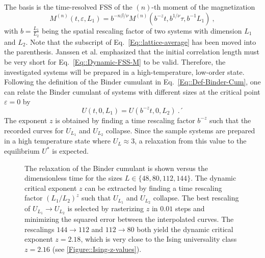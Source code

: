 	The basis is the time-resolved FSS of the $(n)$-th moment of the magnetization \cite{li1995dynamic}
	\begin{equation} \label{Eq::Dynamic-FSS-M}
		M^{(n)}(t, \varepsilon, L_1) = b^{-n \beta / \nu} M^{(n)}(b^{-z}t, b^{1 /	\nu} \tau, b^{-1} L_1) ~,
	\end{equation}
	with $b =	\tfrac{L_1}{L_2}$ being the spatial rescaling factor of two systems with dimension $L_1$ and $L_2$. Note that the subscript of Eq.~\eqref{Eq::lattice-average} has been moved into the parenthesis. Janssen et al. \cite{janssen1989new} emphasized that the initial correlation length must be very short for Eq.~\eqref{Eq::Dynamic-FSS-M} to be valid. Therefore, the investigated systems will be prepared in a high-temperature, low-order state.
	Following the definition of the Binder cumulant in Eq.~\eqref{Eq::Def-Binder-Cum}, one can relate the Binder cumulant of systems with different sizes at the critical point $\varepsilon =	0$ by
	\begin{equation}
		U(t, 0, L_1) =	U(b^{-z} t, 0, L_2)~.´
	\end{equation}
	The exponent $z$ is obtained by finding a time rescaling factor $b^{-z}$ such that the recorded curves for $U_{L_1}$ and $U_{L_2}$ collapse. Since the sample systems are prepared in a high temperature state where $U_L \approx	3$, a relaxation from this value to the equilibrium $U^*$ is expected.
	\begin{figure}
		\centering
		
		\caption{The relaxation of the Binder cumulant is shown versus the dimensionless time for the sizes  $L	\in \{48, 80, 112, 144\}$. The dynamic critical exponent $z$ can be extracted by finding a time rescaling factor $({L_1}/{L_2})^z$ such that $U_{L_1}$ and $U_{L_2}$ collapse.	The best rescaling of $U_{L_1} \rightarrow U_{L_2}$ is selected by rasterizing $z$ in $0.01$ steps and minimizing the squared error between the interpolated curves. The rescalings $144 \rightarrow 112$ and $112 \rightarrow 80$ both yield the dynamic critical exponent $z = 2.18$, which is very close to the Ising universality class $z=2.16$ (see \autoref{Figure::Ising-z-values}). }
		\label{Fig::Cum-Relax-z-extrac}
	\end{figure}
